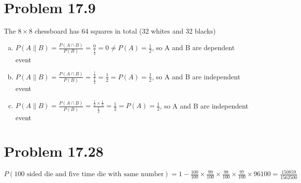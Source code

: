 \documentclass{article}
\def\math#1{$#1$}
\begin{document}
\section{Problem 17.9}
The \math{8 \times 8} chessboard has 64 squares in total (32 whites and 32 blacks)

\begin{enumerate}[a)]
    \item \math{P(A \| B) = \frac{P(A \cap B)}{P(B)} = \frac{0}{\frac{1}{2}} = 0 \neq P(A) = \frac{1}{2}}, so A and B are dependent event
    \item \math{P(A \| B) = \frac{P(A \cap B)}{P(B)} = \frac{\frac{1}{4}}{\frac{1}{2}} = \frac{1}{2} = P(A) = \frac{1}{2}}, so A and B are independent event
    \item \math{P(A \| B) = \frac{P(A \cap B)}{P(B)} = \frac{\frac{1}{2} \times \frac{1}{2}}{\frac{1}{2}} = \frac{1}{2} = P(A) = \frac{1}{2}}, so A and B are independent event
\end{enumerate}

\section{Problem 17.28}

\math{P(\text{100 sided die and five time die with same number}) = 1 - \frac{100}{100} \times \frac{99}{100} \times \frac{98}{100} \times \frac{97}{100} \times{96}{100} = \frac{150859}{1562500} }
\end{document}
